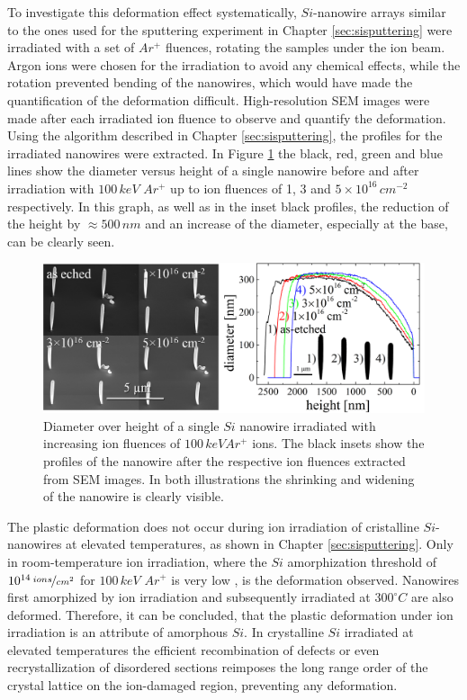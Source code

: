 To investigate this deformation effect systematically, $Si$-nanowire arrays similar to the ones used for the sputtering experiment in Chapter \ref{sec:sisputtering} were irradiated with a set of $Ar^+$ fluences, rotating the samples under the ion beam. Argon ions were chosen for the irradiation to avoid any chemical effects, while the rotation prevented bending of the nanowires, which would have made the quantification of the deformation difficult.  High-resolution SEM images were made after each irradiated ion fluence to observe and quantify the deformation. Using the algorithm described in Chapter \ref{sec:sisputtering}, the profiles for the irradiated nanowires were extracted. In Figure \ref{deformationprofile} the black, red, green and blue lines show the diameter versus height of a single nanowire before and after irradiation with $100\,keV\,\,Ar^+$ up to ion fluences of 1, 3 and $5 \times 10^{16}\,cm^{-2}$ respectively. In this graph, as well as in the inset black profiles, the reduction of the height by $\approx 500\,nm$ and an increase of the diameter, especially at the base, can be clearly seen. 


\begin{figure}[thbp]
	\centering
		\includegraphics[width=.8\textwidth]{images/deformationprofileandSEM.jpg}
		\caption{Diameter over height of a single $Si$ nanowire irradiated with increasing ion fluences of $100\,keV Ar^+$ ions. The black insets show the profiles of the nanowire after the respective ion fluences extracted from SEM images. In both illustrations the shrinking and widening of the nanowire is clearly visible.} 
	\label{deformationprofile} 
\end{figure}

The plastic deformation does not occur during ion irradiation of cristalline $Si$-nanowires at elevated temperatures, as shown in Chapter \ref{sec:sisputtering}. Only in room-temperature ion irradiation, where the $Si$ amorphization threshold of $10^{14}\,\nicefrac{ions}{cm^2}$ for $100\,keV\,\,Ar^+$ is very low \cite{pelaz_ion-beam-induced_2004}, is the deformation observed. Nanowires first amorphized by ion irradiation and subsequently irradiated at $300^\circ C$ are also deformed. Therefore, it can be concluded, that the plastic deformation under ion irradiation is an attribute of amorphous $Si$. In crystalline $Si$ irradiated at elevated temperatures the efficient recombination of defects or even recrystallization of disordered sections reimposes the long range order of the crystal lattice on the ion-damaged region, preventing any deformation.


